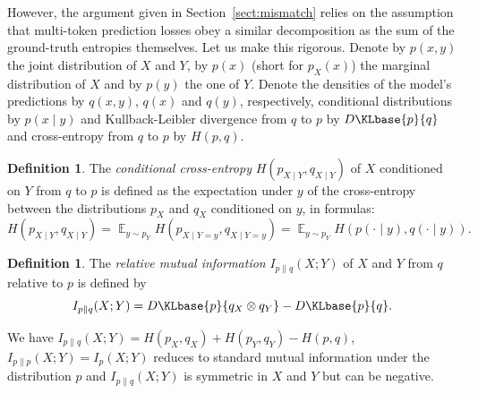 \documentclass{article}
\newcommand{\KL}{D\KLbase}
\theoremstyle{plain}
\theoremstyle{definition}
\newtheorem{definition}[theorem]{Definition}
\theoremstyle{remark}
\DeclareMathOperator*{\E}{\mathbb{E}}
\begin{document}
However, the argument given in Section~\ref{sect:mismatch} relies on the assumption that multi-token prediction losses obey a similar decomposition as the sum of the ground-truth entropies themselves. Let us make this rigorous. Denote by $p(x, y)$ the joint distribution of $X$ and $Y$, by $p(x)$ (short for $p_X(x)$) the marginal distribution of $X$ and by $p(y)$ the one of $Y$. Denote the densities of the model's predictions by $q(x, y)$, $q(x)$ and $q(y)$, respectively, conditional distributions by $p(x \mid y)$ and Kullback-Leibler divergence from $q$ to $p$ by $\KL{p}{q}$ and cross-entropy from $q$ to $p$ by $H(p, q)$.
\begin{definition}
    The \emph{conditional cross-entropy} $H(p_{X \mid Y}, q_{X \mid Y})$ of $X$ conditioned on $Y$ from $q$ to $p$ is defined as the expectation under $y$ of the cross-entropy between the distributions $p_X$ and $q_X$ conditioned on $y$, in formulas:
    \[
    H(p_{X \mid Y}, q_{X \mid Y})
    = \E_{y \sim p_Y} H(p_{X \mid Y=y}, q_{X \mid Y=y})
    = \E_{y \sim p_Y} H(p(\cdot \mid y), q(\cdot \mid y)).
    \]
\end{definition}
\begin{definition}
    The \emph{relative mutual information} $I_{p \| q}(X; Y)$ of $X$ and $Y$ from $q$ relative to $p$ is defined by
    \[
    I_{p \| q}(X; Y)
    = \KL{p}{q_X \otimes q_Y} - \KL{p}{q}.
    \]
\end{definition}
We have $I_{p \| q}(X; Y) = H(p_X, q_X) + H(p_Y, q_Y) - H(p, q)$, $I_{p \| p}(X; Y) = I_p(X; Y)$ reduces to standard mutual information under the distribution $p$ and $I_{p \| q}(X; Y)$ is symmetric in $X$ and $Y$ but can be negative.
\end{document}
